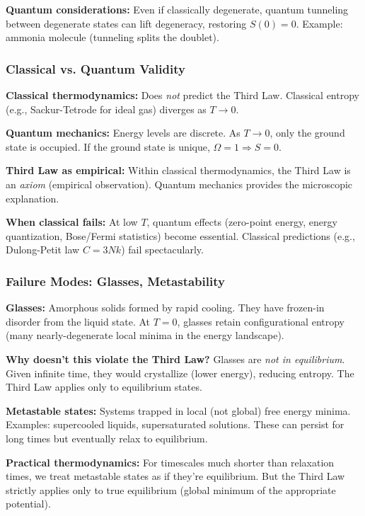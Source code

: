 \documentclass[9pt,twocoloumn]{article}
\begin{document}
\textbf{Quantum considerations:} Even if classically degenerate, quantum tunneling between degenerate states can lift degeneracy, restoring $S(0) = 0$. Example: ammonia molecule (tunneling splits the doublet).

\subsubsection{Classical vs. Quantum Validity}

\textbf{Classical thermodynamics:} Does \emph{not} predict the Third Law. Classical entropy (e.g., Sackur-Tetrode for ideal gas) diverges as $T \to 0$.

\textbf{Quantum mechanics:} Energy levels are discrete. As $T \to 0$, only the ground state is occupied. If the ground state is unique, $\Omega = 1 \Rightarrow S = 0$.

\textbf{Third Law as empirical:} Within classical thermodynamics, the Third Law is an \emph{axiom} (empirical observation). Quantum mechanics provides the microscopic explanation.

\textbf{When classical fails:} At low $T$, quantum effects (zero-point energy, energy quantization, Bose/Fermi statistics) become essential. Classical predictions (e.g., Dulong-Petit law $C = 3Nk$) fail spectacularly.

\subsubsection{Failure Modes: Glasses, Metastability}

\textbf{Glasses:} Amorphous solids formed by rapid cooling. They have frozen-in disorder from the liquid state. At $T = 0$, glasses retain configurational entropy (many nearly-degenerate local minima in the energy landscape).

\textbf{Why doesn't this violate the Third Law?} Glasses are \emph{not in equilibrium}. Given infinite time, they would crystallize (lower energy), reducing entropy. The Third Law applies only to equilibrium states.

\textbf{Metastable states:} Systems trapped in local (not global) free energy minima. Examples: supercooled liquids, supersaturated solutions. These can persist for long times but eventually relax to equilibrium.

\textbf{Practical thermodynamics:} For timescales much shorter than relaxation times, we treat metastable states as if they're equilibrium. But the Third Law strictly applies only to true equilibrium (global minimum of the appropriate potential).
\end{document}
